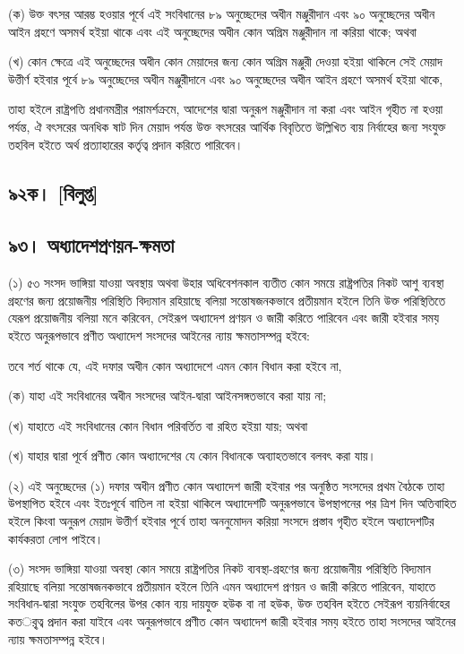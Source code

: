 \documentclass[11pt]{article}
\begin{document}
(ক) উক্ত বৎসর আরম্ভ হওয়ার পূর্বে এই সংবিধানের ৮৯ অনুচ্ছেদের অধীন মঞ্জুরীদান
    এবং ৯০ অনুচ্ছেদের অধীন আইন গ্রহণে অসমর্থ হইয়া থাকে এবং এই অনুচ্ছেদের অধীন
    কোন অগ্রিম মঞ্জুরীদান না করিয়া থাকে; অথবা

(খ) কোন ক্ষেত্রে এই অনুচ্ছেদের অধীন কোন মেয়াদের জন্য কোন অগ্রিম মঞ্জুরী দেওয়া
    হইয়া থাকিলে সেই মেয়াদ উত্তীর্ণ হইবার পূর্বে ৮৯ অনুচ্ছেদের অধীন মঞ্জুরীদানে এবং
    ৯০ অনুচ্ছেদের অধীন আইন গ্রহণে অসমর্থ হইয়া থাকে,

তাহা হইলে রাষ্ট্রপতি প্রধানমন্ত্রীর পরামর্শক্রমে, আদেশের দ্বারা অনুরূপ মঞ্জুরীদান
না করা এবং আইন গৃহীত না হওয়া পর্যন্ত, ঐ বৎসরের অনধিক ষাট দিন মেয়াদ পর্যন্ত
উক্ত বৎসরের আর্থিক বিবৃতিতে উল্লিখিত ব্যয় নির্বাহের জন্য সংযুক্ত তহবিল হইতে অর্থ
প্রত্যাহারের কর্তৃত্ব প্রদান করিতে পারিবেন।

\subsection{৯২ক। [বিলুপ্ত]}
\label{sec:org9cb4b46}
\subsection{৯৩। অধ্যাদেশপ্রণয়ন-ক্ষমতা}
\label{sec:org6eda3f1}
(১) ৫৩ সংসদ ভাঙ্গিয়া যাওয়া অবস্থায় অথবা উহার অধিবেশনকাল ব্যতীত কোন সময়ে
    রাষ্ট্রপতির নিকট আশু ব্যবস্থা গ্রহণের জন্য প্রয়োজনীয় পরিস্থিতি বিদ্যমান রহিয়াছে
    বলিয়া সন্তোষজনকভাবে প্রতীয়মান হইলে তিনি উক্ত পরিস্থিতিতে যেরূপ প্রয়োজনীয়
    বলিয়া মনে করিবেন, সেইরূপ অধ্যাদেশ প্রণয়ন ও জারী করিতে পারিবেন এবং জারী
    হইবার সময় হইতে অনুরূপভাবে প্রণীত অধ্যাদেশ সংসদের আইনের ন্যায় ক্ষমতাসম্পন্ন
    হইবে:

তবে শর্ত থাকে যে, এই দফার অধীন কোন অধ্যাদেশে এমন কোন বিধান করা হইবে না,

(ক) যাহা এই সংবিধানের অধীন সংসদের আইন-দ্বারা আইনসঙ্গতভাবে করা যায় না;

(খ) যাহাতে এই সংবিধানের কোন বিধান পরিবর্তিত বা রহিত হইয়া যায়; অথবা

(খ) যাহার দ্বারা পূর্বে প্রণীত কোন অধ্যাদেশের যে কোন বিধানকে অব্যাহতভাবে
    বলবৎ করা যায়।

(২) এই অনুচ্ছেদের (১) দফার অধীন প্রণীত কোন অধ্যাদেশ জারী হইবার পর অনুষ্ঠিত
    সংসদের প্রথম বৈঠকে তাহা উপস্থাপিত হইবে এবং ইতঃপূর্বে বাতিল না হইয়া থাকিলে
    অধ্যাদেশটি অনুরূপভাবে উপস্থাপনের পর ত্রিশ দিন অতিবাহিত হইলে কিংবা অনুরূপ
    মেয়াদ উত্তীর্ণ হইবার পূর্বে তাহা অননুমোদন করিয়া সংসদে প্রস্তাব গৃহীত হইলে
    অধ্যাদেশটির কার্যকরতা লোপ পাইবে।

(৩) সংসদ ভাঙ্গিয়া যাওয়া অবস্থা কোন সময়ে রাষ্ট্রপতির নিকট ব্যবস্থা-গ্রহণের জন্য
    প্রয়োজনীয় পরিস্থিতি বিদ্যমান রহিয়াছে বলিয়া সন্তোষজনকভাবে প্রতীয়মান হইলে
    তিনি এমন অধ্যাদেশ প্রণয়ন ও জারী করিতে পারিবেন, যাহাতে সংবিধান-দ্বারা
    সংযুক্ত তহবিলের উপর কোন ব্যয় দায়যুক্ত হউক বা না হউক, উক্ত তহবিল হইতে সেইরূপ
    ব্যয়নির্বাহের কতর্ৃত্ব প্রদান করা যাইবে এবং অনুরূপভাবে প্রণীত কোন অধ্যাদেশ জারী
    হইবার সময় হইতে তাহা সংসদের আইনের ন্যায় ক্ষমতাসম্পন্ন হইবে।
\end{document}
